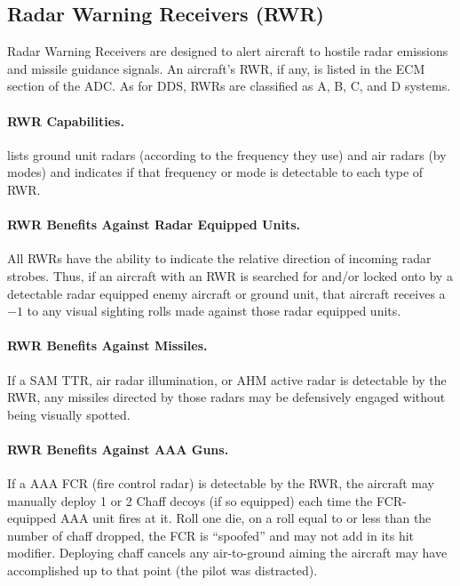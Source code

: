 \begin{advancedrules}
\section{Radar Warning Receivers (RWR)}
\label{rule:rwr}

Radar Warning Receivers are designed to alert aircraft to hostile radar emissions and missile guidance signals. An aircraft's RWR, if any, is listed in the ECM section of the ADC. As for DDS, RWRs are classified as A, B, C, and D systems.

\paragraph{RWR Capabilities.}  lists ground unit radars (according to the frequency they use) and air radars (by modes) and indicates if that frequency or mode is detectable to each type of RWR.

\paragraph{RWR Benefits Against Radar Equipped Units.} All RWRs have the ability to indicate the relative direction of incoming radar strobes. Thus, if an aircraft with an RWR is searched for and/or locked onto by a detectable radar equipped enemy aircraft or ground unit, that aircraft receives a $-1$ to any visual sighting rolls made against those radar equipped units.

\paragraph{RWR Benefits Against Missiles.} If a SAM TTR, air radar illumination, or AHM active radar is detectable by the RWR, any missiles directed by those radars may be defensively engaged without being visually spotted.

\paragraph{RWR Benefits Against AAA Guns.} If a AAA FCR (fire control radar) is detectable by the RWR, the aircraft may manually deploy 1 or 2 Chaff decoys (if so equipped) each time the FCR-equipped AAA unit fires at it. Roll one die, on a roll equal to or less than the number of chaff dropped, the FCR is “spoofed” and may not add in its hit modifier. Deploying chaff cancels any air-to-ground aiming the aircraft may have accomplished up to that point (the pilot was distracted).


\end{advancedrules}
